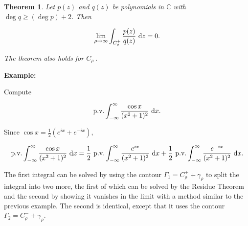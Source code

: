 \documentclass{article}
\theoremstyle{colontheorem}
\newtheorem{theorem}{Theorem}[section]
\newcommand{\pv}{\textnormal{p.v.}}
\newenvironment{Theorem}
{
	\begin{mdframed}[backgroundcolor=TheoremOrange!10]
	\begin{theorem}
}
{
	\end{theorem}
	\end{mdframed}
	
	\vspace{.15in}
}
\newenvironment{Example}
{
	\begin{mdframed}
	\textbf{Example:}%
}
{
	\end{mdframed}
	
	\vspace{.15in}
}
\begin{document}
\begin{Theorem}
	
	Let $p(z)$ and $q(z)$ be polynomials in $\mathbb{C}$ with $\deg q \geq (\deg p) + 2$. Then
	
	$$
		\lim\limits_{\rho \to \infty} \int_{C_\rho^+} \frac{p(z)}{q(z)}\ \textnormal{d}z = 0.
	$$
	
	The theorem also holds for $C_\rho^-$.
	
\end{Theorem}



\begin{Example}
	Compute
	
	$$
		\pv \int_{-\infty}^{\infty} \frac{\cos x}{(x^2 + 1)^2}\ \textnormal{d}x.
	$$
	
	Since $\cos x = \frac{1}{2} (e^{ix} + e^{-ix})$,
	
	$$
		\pv \int_{-\infty}^{\infty} \frac{\cos x}{(x^2 + 1)^2}\ \textnormal{d}x = \frac{1}{2}\ \pv \int_{-\infty}^{\infty} \frac{e^{ix}}{(x^2 + 1)^2}\ \textnormal{d}x + \frac{1}{2}\ \pv \int_{-\infty}^{\infty} \frac{e^{-ix}}{(x^2 + 1)^2}\ \textnormal{d}x.
	$$
	
	The first integral can be solved by using the contour $\Gamma_1 = C_\rho^+ + \gamma_\rho$ to split the integral into two more, the first of which can be solved by the Residue Theorem and the second by showing it vanishes in the limit with a method similar to the previous example. The second is identical, except that it uses the contour $\Gamma_2 = C_\rho^- + \gamma_\rho$.
	
\end{Example}
\end{document}
